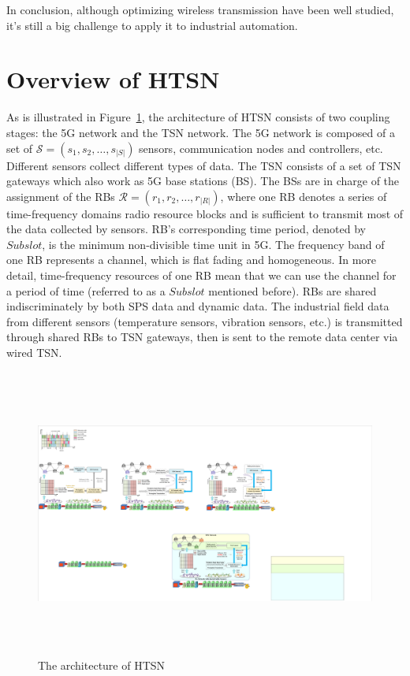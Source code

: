\documentclass{SCIS2021}
\begin{document}
	\par In conclusion, although optimizing wireless transmission have been well studied, it's still a big challenge to apply it to industrial automation.
	
	
	\section{Overview of HTSN}
	\label{sec:Overview of HTSN}
	As is illustrated in Figure~\ref{fig:The architecture of HTSN}, the architecture of HTSN consists of two coupling stages: the 5G network and the TSN network. The 5G network is composed of a set of $\mathcal{S}=\left(s_{1}, s_{2}, \ldots, s_{|S|}\right)$ sensors, communication nodes and controllers, etc. Different sensors collect different types of data. The TSN consists of a set of TSN gateways which also work as 5G base stations (BS). The BSs are in charge of the assignment of the RBs $\mathcal{R}=\left(r_{1}, r_{2}, \ldots, r_{|R|}\right)$, {\color{blue} where one RB denotes a series of time-frequency domains radio resource blocks and is sufficient to transmit most of the data collected by sensors. RB's corresponding time period, denoted by $\mathit{Subslot}$, is the minimum non-divisible time unit in 5G. The frequency band of one RB represents a channel, which is flat fading and homogeneous. In more detail, time-frequency resources of one RB mean that we can use the channel for a period of time (referred to as a $Subslot$ mentioned before).} {\color{black}RBs are shared indiscriminately by both SPS data and dynamic data.} The industrial field data from different sensors (temperature sensors, vibration sensors, etc.) is transmitted through shared RBs to TSN gateways, then is sent to the remote data center via wired TSN.
	
	\begin{figure}[htb] 
		\centering 
		\includegraphics[height=9.5cm, width=13.8cm]{framework} 
		\caption{The architecture of HTSN} 
		\label{fig:The architecture of HTSN}
	\end{figure}
	
\end{document}
